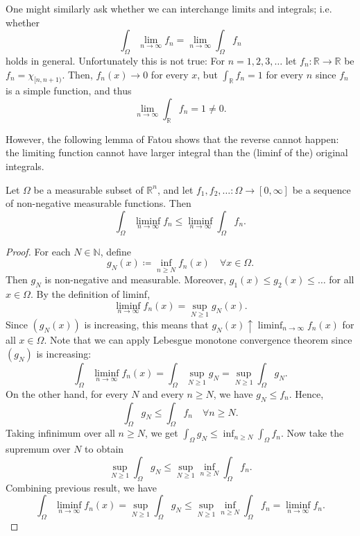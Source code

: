 One might similarly ask whether we can interchange limits and integrals; i.e. whether 
\[
    \int _\Omega \lim_{n \to \infty} f_n = \lim_{n \to \infty} \int _\Omega f_n  
\]
holds in general. Unfortunately this is not true: For \(n = 1, 2, 3, \dots \) let \(f_n: \mathbb{R} \to \mathbb{R} \) be \(f_n = \chi _{[n, n+1)}\). Then, \(f_n(x) \to 0\) for every \(x\), but \(\int _\mathbb{R} f_n = 1\) for every \(n\) since \(f_n\) is a simple function, and thus 
\[
    \lim_{n \to \infty} \int _\mathbb{R} f_n = 1 \neq 0. 
\]        

However, the following lemma of Fatou shows that the reverse cannot happen: the limiting function cannot have larger integral than the (liminf of the) original integrals. 

\begin{lemma} \label{lm: Fatou}
    Let \(\Omega\) be a measurable subset of \(\mathbb{R} ^n\), and let \(f_1, f_2, \dots : \Omega \to [0, \infty]\) be a sequence of non-negative measurable functions. Then 
    \[
        \int _\Omega \liminf_{n \to \infty} f_n \le \liminf_{n \to \infty} \int _\Omega f_n.  
    \]   
\end{lemma}

\begin{proof}
    For each \(N \in \mathbb{N} \), define 
    \[
        g_N(x) \coloneqq \inf_{n \ge N} f_n(x) \quad \forall x \in \Omega.
    \] 
    Then \(g_N\) is non-negative and measurable. Moreover, \(g_1(x) \le g_2(x) \le \dots \) for all \(x \in \Omega\). By the definition of liminf, 
    \[
        \liminf_{n \to \infty} f_n(x) = \sup _{N \ge 1} g_N(x). 
    \]  
    Since \((g_N(x))\) is increasing, this means that \(g_N(x) \uparrow \liminf_{n \to \infty} f_n(x) \) for all \(x \in \Omega\). Note that we can apply Lebesgue monotone convergence theorem since \((g_N)\) is increasing:
    \[
        \int _\Omega \liminf_{n \to \infty} f_n(x) = \int _\Omega \sup _{N \ge 1} g_N = \sup _{N \ge 1} \int _\Omega g_N.
    \]
    On the other hand, for every \(N\) and every \(n \ge N\), we have \(g_N \le f_n\). Hence,
    \[
        \int _\Omega g_N \le \int _\Omega f_n \quad \forall n \ge N.
    \]  
    Taking infinimum over all \(n \ge N\), we get \(\int _\Omega g_N \le \inf_{n \ge N} \int _\Omega f_n\). Now take the supremum over \(N\) to obtain 
    \[
        \sup _{N \ge 1} \int _\Omega g_N \le \sup _{N \ge 1} \inf_{n \ge N} \int _\Omega f_n.
    \]   
    Combining previous result, we have 
    \[
       \int _\Omega \liminf_{n \to \infty} f_n(x) = \sup _{N \ge 1} \int _\Omega g_N \le \sup _{N \ge 1} \inf _{n \ge N} \int_\Omega f_n = \liminf_{n \to \infty} f_n.  
    \]

\end{proof}

